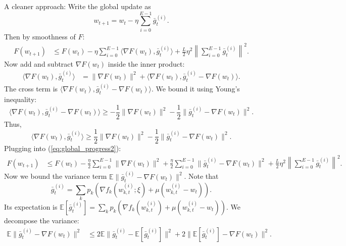 \documentclass{article}
\begin{document}
A cleaner approach: Write the global update as
\begin{equation}
    w_{t+1} = w_t - \eta \sum_{i=0}^{E-1} \bar{g}_t^{(i)}.
\end{equation}
Then by smoothness of $F$:
\begin{align}
    F(w_{t+1}) &\leq F(w_t) - \eta \sum_{i=0}^{E-1} \langle \nabla F(w_t), \bar{g}_t^{(i)} \rangle + \frac{L}{2} \eta^2 \left\| \sum_{i=0}^{E-1} \bar{g}_t^{(i)} \right\|^2. \label{eq:global_progress2}
\end{align}
Now add and subtract $\nabla F(w_t)$ inside the inner product:
\begin{align}
    \langle \nabla F(w_t), \bar{g}_t^{(i)} \rangle &= \| \nabla F(w_t) \|^2 + \langle \nabla F(w_t), \bar{g}_t^{(i)} - \nabla F(w_t) \rangle.
\end{align}
The cross term is $\langle \nabla F(w_t), \bar{g}_t^{(i)} - \nabla F(w_t) \rangle$. We bound it using Young's inequality:
\begin{equation}
    \langle \nabla F(w_t), \bar{g}_t^{(i)} - \nabla F(w_t) \rangle \geq -\frac{1}{2} \| \nabla F(w_t) \|^2 - \frac{1}{2} \| \bar{g}_t^{(i)} - \nabla F(w_t) \|^2.
\end{equation}
Thus,
\begin{equation}
    \langle \nabla F(w_t), \bar{g}_t^{(i)} \rangle \geq \frac{1}{2} \| \nabla F(w_t) \|^2 - \frac{1}{2} \| \bar{g}_t^{(i)} - \nabla F(w_t) \|^2.
\end{equation}
Plugging into (\ref{eq:global_progress2}):
\begin{align}
    F(w_{t+1}) &\leq F(w_t) - \frac{\eta}{2} \sum_{i=0}^{E-1} \| \nabla F(w_t) \|^2 + \frac{\eta}{2} \sum_{i=0}^{E-1} \| \bar{g}_t^{(i)} - \nabla F(w_t) \|^2 + \frac{L}{2} \eta^2 \left\| \sum_{i=0}^{E-1} \bar{g}_t^{(i)} \right\|^2. \label{eq:global_progress3}
\end{align}
Now we bound the variance term $\mathbb{E} \| \bar{g}_t^{(i)} - \nabla F(w_t) \|^2$. Note that
\begin{equation}
    \bar{g}_t^{(i)} = \sum_k p_k \left( \nabla f_k(w_{k,t}^{(i)}; \xi) + \mu (w_{k,t}^{(i)} - w_t) \right).
\end{equation}
Its expectation is $\mathbb{E}[\bar{g}_t^{(i)}] = \sum_k p_k \left( \nabla f_k(w_{k,t}^{(i)}) + \mu (w_{k,t}^{(i)} - w_t) \right)$.
We decompose the variance:
\begin{align}
    \mathbb{E} \| \bar{g}_t^{(i)} - \nabla F(w_t) \|^2 
    &\leq 2 \mathbb{E} \| \bar{g}_t^{(i)} - \mathbb{E}[\bar{g}_t^{(i)}] \|^2 + 2 \| \mathbb{E}[\bar{g}_t^{(i)}] - \nabla F(w_t) \|^2. \label{eq:var_decomp}
\end{align}
\end{document}
